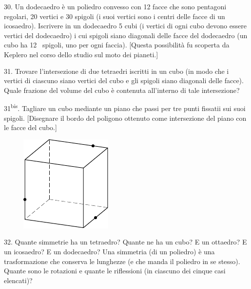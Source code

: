 \begin{problem}{30.}
	Un dodecaedro è un poliedro convesso con 12 facce che sono pentagoni regolari, 20 vertici e 30 spigoli (i suoi vertici sono i centri delle facce di un icosaedro).
Iscrivere in un dodecaedro 5 cubi (i vertici di ogni cubo devono essere vertici  del dodecaedro) i cui  spigoli siano diagonali delle facce del dodecaedro  (un cubo ha 12 ~spigoli, uno per ogni faccia). [Questa possibilità fu scoperta da Keplero nel corso dello studio sul moto dei pianeti.]
\end{problem}

\begin{problem}{31.}
	Trovare l’intersezione di due tetraedri iscritti in un cubo (in modo che i vertici di ciascuno siano vertici del cubo e gli spigoli siano diagonali delle facce). Quale frazione del volume del cubo è contenuta all’interno di tale intersezione?
\end{problem}

\begin{problem}{31\textsuperscript{bis}.}
	Tagliare un cubo mediante un piano che passi per tre punti fissatii sui suoi spigoli. [Disegnare il bordo del poligono ottenuto come intersezione del piano con le facce del cubo.]
	\begin{figure}
		\includegraphics{resources/taskbook-15}
	\end{figure}
\end{problem}

\begin{problem}{32.}
	Quante simmetrie ha un tetraedro? Quante ne ha un cubo? E un ottaedro? E un icosaedro? E un dodecaedro? Una simmetria (di un poliedro) è una trasformazione che conserva le lunghezze (e che manda il poliedro in se stesso).
Quante sono le rotazioni e quante le riflessioni (in ciascuno dei cinque casi elencati)?
\end{problem}

